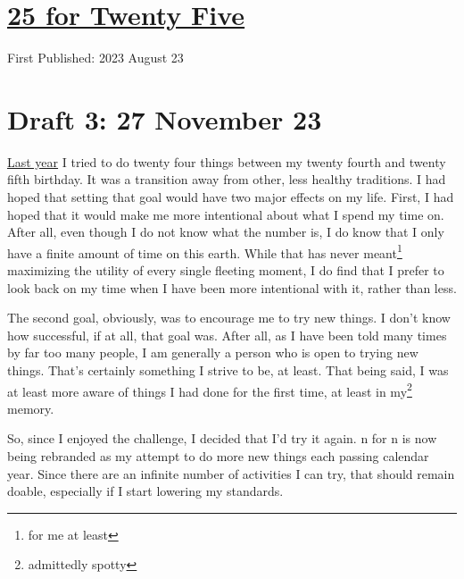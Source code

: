 \documentclass[12pt]{article}[titlepage]
\newcommand{\1}{\={a}}
\newcommand{\2}{\={e}}
\newcommand{\3}{\={\i}}
\newcommand{\4}{\=o}
\newcommand{\5}{\=u}
\newcommand{\6}{\={A}}
\renewcommand{\,}{\textsuperscript{,}}
\begin{document}
\doublespacing
\section{\href{twenty-five.html}{25 for Twenty Five}}
First Published: 2023 August 23

\section{Draft 3: 27 November 23}
\href{twenty-four.html}{Last year} I tried to do twenty four things between my twenty fourth and twenty fifth birthday.
It was a transition away from other, less healthy traditions.
I had hoped that setting that goal would have two major effects on my life.
First, I had hoped that it would make me more intentional about what I spend my time on.
After all, even though I do not know what the number is, I do know that I only have a finite amount of time on this earth.
While that has never meant\footnote{for me at least} maximizing the utility of every single fleeting moment, I do find that I prefer to look back on my time when I have been more intentional with it, rather than less.

The second goal, obviously, was to encourage me to try new things.
I don't know how successful, if at all, that goal was.
After all, as I have been told many times by far too many people, I am generally a person who is open to trying new things.
That's certainly something I strive to be, at least.
That being said, I was at least more aware of things I had done for the first time, at least in my\footnote{admittedly spotty} memory.

So, since I enjoyed the challenge, I decided that I'd try it again.
n for n is now being rebranded as my attempt to do more new things each passing calendar year.
Since there are an infinite number of activities I can try, that should remain doable, especially if I start lowering my standards.
\end{document}
